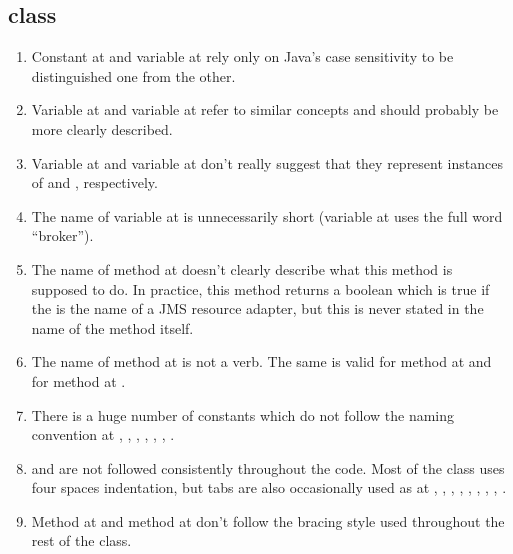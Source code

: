 \subsection{ class}
\begin{enumerate}
	\item {} Constant  at  and variable  at  rely only on Java's case sensitivity to be distinguished one from the other. 
	\item {} Variable  at  and variable  at  refer to similar concepts and should probably be more clearly described. 
	\item {} Variable  at  and variable  at  don't really suggest that they represent instances of  and , respectively.
	\item {} The name of variable  at  is unnecessarily short (variable  at  uses the full word “broker”). 
	\item {} The name of method  at  doesn't clearly describe what this method is supposed to do. In practice, this method returns a boolean which is true if the  is the name of a JMS resource adapter, but this is never stated in the name of the method itself. 
	\item {} The name of method  at  is not a verb. The same is valid for method  at  and for method  at .
	\item {} There is a huge number of constants which do not follow the naming convention at , , , , , , . 
	\item {} and  are not followed consistently throughout the code. Most of the class uses four spaces indentation, but tabs are also occasionally used as at , , , , , , , , . 
	\item {} Method  at  and method  at  don't follow the bracing style used throughout the rest of the class.

\end{enumerate}
